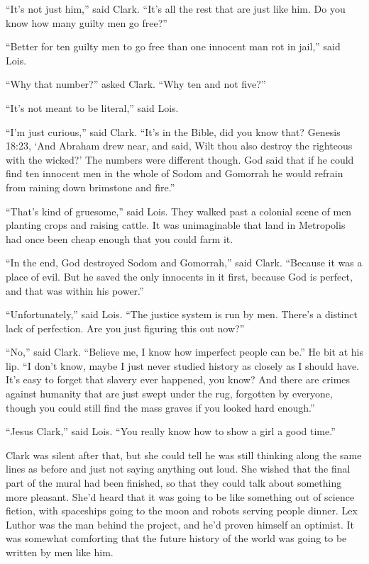 ``It's not just him,'' said Clark. ``It's all the rest that are just
like him. Do you know how many guilty men go free?''

``Better for ten guilty men to go free than one innocent man rot in
jail,'' said Lois.

``Why that number?'' asked Clark. ``Why ten and not five?''

``It's not meant to be literal,'' said Lois.

``I'm just curious,'' said Clark. ``It's in the Bible, did you know
that? Genesis 18:23, `And Abraham drew near, and said, Wilt thou also
destroy the righteous with the wicked?' The numbers were different
though. God said that if he could find ten innocent men in the whole of
Sodom and Gomorrah he would refrain from raining down brimstone and
fire.''

``That's kind of gruesome,'' said Lois. They walked past a colonial
scene of men planting crops and raising cattle. It was unimaginable that
land in Metropolis had once been cheap enough that you could farm it.

``In the end, God destroyed Sodom and Gomorrah,'' said Clark. ``Because
it was a place of evil. But he saved the only innocents in it first,
because God is perfect, and that was within his power.''

``Unfortunately,'' said Lois. ``The justice system is run by men.
There's a distinct lack of perfection. Are you just figuring this out
now?''

``No,'' said Clark. ``Believe me, I know how imperfect people can be.''
He bit at his lip. ``I don't know, maybe I just never studied history as
closely as I should have. It's easy to forget that slavery ever
happened, you know? And there are crimes against humanity that are just
swept under the rug, forgotten by everyone, though you could still find
the mass graves if you looked hard enough.''

``Jesus Clark,'' said Lois. ``You really know how to show a girl a good
time.''

Clark was silent after that, but she could tell he was still thinking
along the same lines as before and just not saying anything out loud.
She wished that the final part of the mural had been finished, so that
they could talk about something more pleasant. She'd heard that it was
going to be like something out of science fiction, with spaceships going
to the moon and robots serving people dinner. Lex Luthor was the man
behind the project, and he'd proven himself an optimist. It was somewhat
comforting that the future history of the world was going to be written
by men like him.

